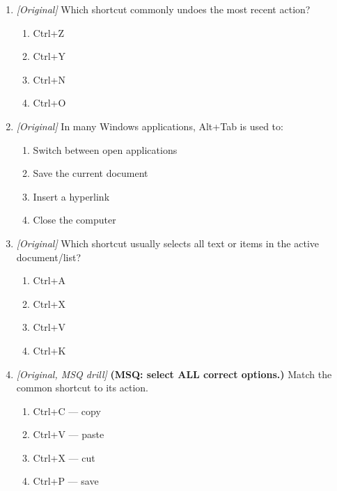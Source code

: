 \begin{enumerate}[label=\textbf{Q\arabic*.}, leftmargin=*]
\item \textit{[Original]} Which shortcut commonly undoes the most recent action?
  \begin{enumerate}[label=\Alph*.]
\item Ctrl+Z
   \item Ctrl+Y
   \item Ctrl+N
   \item Ctrl+O
  \end{enumerate}

\item \textit{[Original]} In many Windows applications, Alt+Tab is used to:
  \begin{enumerate}[label=\Alph*.]
\item Switch between open applications
   \item Save the current document
   \item Insert a hyperlink
   \item Close the computer
  \end{enumerate}

\item \textit{[Original]} Which shortcut usually selects all text or items in the active document/list?
  \begin{enumerate}[label=\Alph*.]
\item Ctrl+A
   \item Ctrl+X
   \item Ctrl+V
   \item Ctrl+K
  \end{enumerate}

\item \textit{[Original, MSQ drill]} \textbf{(MSQ: select ALL correct options.)} Match the common shortcut to its action.
  \begin{enumerate}[label=\Alph*.]
\item Ctrl+C --- copy
   \item Ctrl+V --- paste
   \item Ctrl+X --- cut
   \item Ctrl+P --- save
  \end{enumerate}

\end{enumerate}
